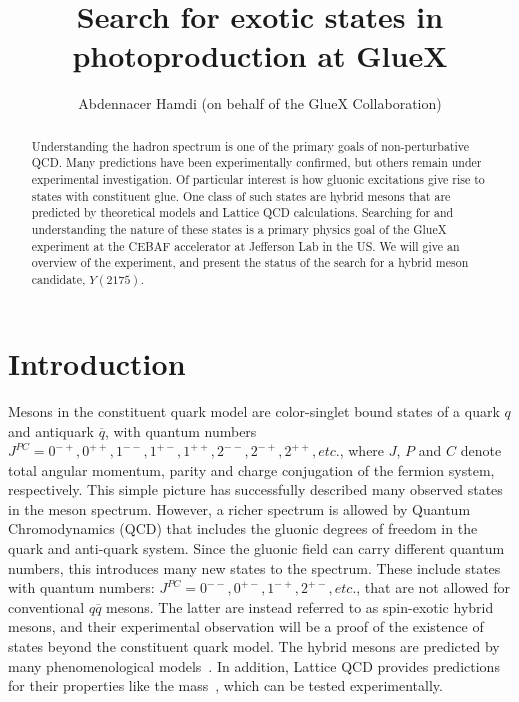 \documentclass[a4paper]{jpconf}
\begin{document}
\title{Search for exotic states in photoproduction at GlueX}

\author{Abdennacer Hamdi (on behalf of the GlueX Collaboration)}

\address{GSI Helmholtzzentrum f\"ur Schwerionenforschung GmbH, Planckstr. 1, 64291 Darmstadt, Germany}

\begin{abstract}
    Understanding the hadron spectrum is one of the primary goals of non-perturbative QCD. Many predictions have been experimentally confirmed, but others remain under experimental investigation. Of particular interest is how gluonic excitations give rise to states with constituent glue. One class of such states are hybrid mesons that are predicted by theoretical models and Lattice QCD calculations. Searching for and understanding the nature of these states is a primary physics goal of the GlueX experiment at the CEBAF accelerator at Jefferson Lab in the US. We will give an overview of the experiment, and present the status of the search for a hybrid meson candidate, $Y(2175)$.
\end{abstract}

\section{Introduction}

Mesons in the constituent quark model are color-singlet bound states of a quark $q$ and antiquark $\overline{q}$, with quantum numbers $J^{PC} = 0^{-+}, 0^{++}, 1^{--}, 1^{+-}, 1^{++}, 2^{--}, 2^{-+}, 2^{++}, etc$., where $J$, $P$ and $C$ denote total angular momentum, parity and charge conjugation of the fermion system, respectively. This simple picture has successfully described many observed states in the meson spectrum. However, a richer spectrum is allowed by Quantum Chromodynamics (QCD) that includes the gluonic degrees of freedom in the quark and anti-quark system. Since the gluonic field can carry different quantum numbers, this introduces many new states to the spectrum. These include states with quantum numbers: $J^{PC} = 0^{--}, 0^{+-}, 1^{-+}, 2^{+-}, etc$., that are not allowed for conventional $q\overline{q}$ mesons. The latter are instead referred to as spin-exotic hybrid mesons, and their experimental observation will be a proof of the existence of states beyond the constituent quark model. The hybrid mesons are predicted by many phenomenological models~\cite{ref.1}. In addition, Lattice QCD provides predictions for their properties like the mass~\cite{ref.2}, which can be tested experimentally.
\end{document}
